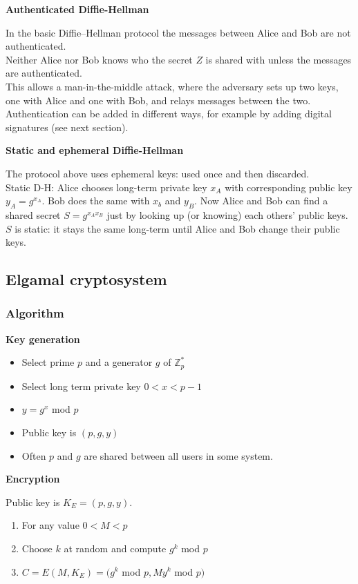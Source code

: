 \documentclass{article}
\begin{document}
\textbf{Authenticated Diffie-Hellman}

In the basic Diffie–Hellman protocol the messages between Alice and Bob are not authenticated.\\
Neither Alice nor Bob knows who the secret $Z$ is shared with unless the messages are authenticated.\\
This allows a man-in-the-middle attack, where the adversary sets up two keys, one with Alice and one with Bob, and relays messages between the two.\\
Authentication can be added in different ways, for example by adding digital signatures (see next section).

\textbf{Static and ephemeral Diffie-Hellman}

The protocol above uses ephemeral keys: used once and then discarded.\\
Static D-H: Alice chooses long-term private key $x_A$ with corresponding public key $y_A=g^{x_A}$. Bob does the same with $x_b$ and $y_B$. Now Alice and Bob can find a shared secret $S=g^{x_A x_B}$ just by looking up (or knowing) each others' public keys. $S$ is static: it stays the same long-term until Alice and Bob change their public keys.

\subsection{Elgamal cryptosystem}

\subsubsection{Algorithm}

\textbf{Key generation}

\begin{itemize}
    \item Select prime $p$ and a generator $g$ of $\mathbb{Z}_p^*$
    \item Select long term private key $0<x<p-1$
    \item $y= g^x$ mod $p$
    \item Public key is $(p,g,y)$
    \item Often $p$ and $g$ are shared between all users in some system.
\end{itemize}

\textbf{Encryption}

Public key is $K_E = (p,g,y)$.
\begin{enumerate}
    \item For any value $0<M<p$
    \item Choose $k$ at random and compute $g^k$ mod $p$
    \item $C=E(M,K_E)=(g^k$ mod $p, My^k$ mod $p)$
\end{enumerate}
\end{document}
